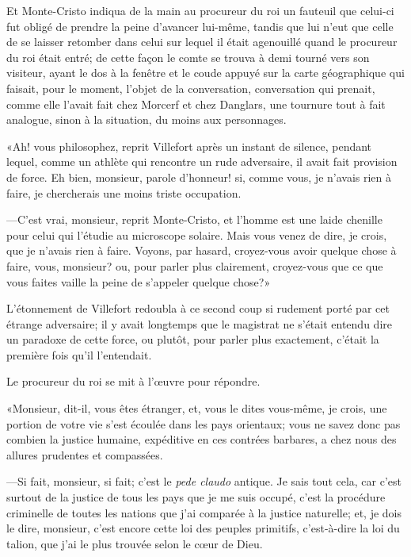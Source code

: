 Et Monte-Cristo indiqua de la main au procureur du roi un fauteuil que celui-ci fut obligé de prendre la peine d'avancer lui-même, tandis que lui n'eut que celle de se laisser retomber dans celui sur lequel il était agenouillé quand le procureur du roi était entré; de cette façon le comte se trouva à demi tourné vers son visiteur, ayant le dos à la fenêtre et le coude appuyé sur la carte géographique qui faisait, pour le moment, l'objet de la conversation, conversation qui prenait, comme elle l'avait fait chez Morcerf et chez Danglars, une tournure tout à fait analogue, sinon à la situation, du moins aux personnages. 

«Ah! vous philosophez, reprit Villefort après un instant de silence, pendant lequel, comme un athlète qui rencontre un rude adversaire, il avait fait provision de force. Eh bien, monsieur, parole d'honneur! si, comme vous, je n'avais rien à faire, je chercherais une moins triste occupation. 

—C'est vrai, monsieur, reprit Monte-Cristo, et l'homme est une laide chenille pour celui qui l'étudie au microscope solaire. Mais vous venez de dire, je crois, que je n'avais rien à faire. Voyons, par hasard, croyez-vous avoir quelque chose à faire, vous, monsieur? ou, pour parler plus clairement, croyez-vous que ce que vous faites vaille la peine de s'appeler quelque chose?» 

L'étonnement de Villefort redoubla à ce second coup si rudement porté par cet étrange adversaire; il y avait longtemps que le magistrat ne s'était entendu dire un paradoxe de cette force, ou plutôt, pour parler plus exactement, c'était la première fois qu'il l'entendait. 

Le procureur du roi se mit à l'œuvre pour répondre. 

«Monsieur, dit-il, vous êtes étranger, et, vous le dites vous-même, je crois, une portion de votre vie s'est écoulée dans les pays orientaux; vous ne savez donc pas combien la justice humaine, expéditive en ces contrées barbares, a chez nous des allures prudentes et compassées.  

—Si fait, monsieur, si fait; c'est le \textit{pede claudo} antique. Je sais tout cela, car c'est surtout de la justice de tous les pays que je me suis occupé, c'est la procédure criminelle de toutes les nations que j'ai comparée à la justice naturelle; et, je dois le dire, monsieur, c'est encore cette loi des peuples primitifs, c'est-à-dire la loi du talion, que j'ai le plus trouvée selon le cœur de Dieu. 


